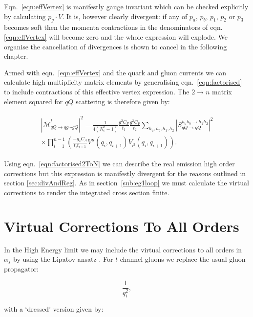 		Eqn.~\eqref{eqn:effVertex} is manifestly gauge invariant which can be checked explicitly by
		calculating $p_g\cdot V$.  It is, however clearly divergent:  if any of $p_a$, $p_b$, $p_1$,
		$p_2$ or $p_3$ becomes soft then the momenta contractions in the denominators of eqn.
		\eqref{eqn:effVertex} will become zero and the whole expression will explode.  We organise
		the cancellation of divergences is shown to cancel in the following chapter.

		Armed with eqn.~\eqref{eqn:effVertex} and the quark and gluon currents we can calculate
		high multiplicity matrix elements by generalising eqn.~\eqref{eqn:factorised} to include
		contractions of this effective vertex expression.  The $2\rightarrow n$ matrix element
		squared for $qQ$ scattering is therefore given by:

		\begin{align}
		\begin{split}
			|\overline{\mathcal{M}}^t_{qQ\rightarrow qg\cdots gQ}|^2 = \frac{1}{4(N_c^2-1)}
			\frac{g^2C_F}{t_1}\frac{g^2C_F}{t_2} \sum_{h_a, h_b, h_1, h_2}
			|S_{qQ\rightarrow qQ}^{h_ah_b\rightarrow h_1h_2}|^2\\
			\times\prod_{i=1}^{n-1}\left(\frac{-g_sC_A}{t_it_{i+1}}V^\mu(q_i, q_{i+1})V_\mu(q_i, q_{i+1})\right).
			\label{eqn:factorised2ToN}
		\end{split}
		\end{align}

		Using eqn.~\eqref{eqn:factorised2ToN} we can describe the real emission high order
		corrections but this expression is manifestly divergent for the reasons outlined in
		section \ref{sec:divAndReg}.  As in section~\ref{sub:eg1loop} we must calculate the
		virtual corrections to render the integrated cross section finite.

	\section{Virtual Corrections To All Orders}
		\label{sub:virtuals}

		In the High Energy limit we may include the virtual corrections to all orders in $\alpha_s$ by using
		the Lipatov ansatz \cite{Kuraev:1976ge}.  For $t$-channel gluons we replace the usual
		gluon propagator:

		\begin{equation}
			\frac{1}{q_i^2},
		\end{equation}

		with a `dressed' version given by:

